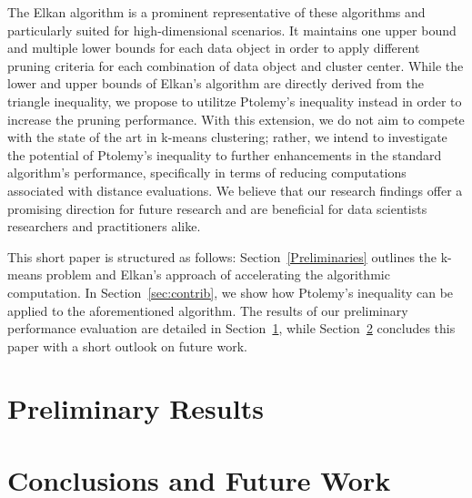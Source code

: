 The Elkan algorithm \cite{DBLP:conf/icml/Elkan03} is a prominent representative of these algorithms and particularly suited for high-dimensional scenarios.
It maintains one upper bound and multiple lower bounds for each data object in order to apply different pruning criteria for each combination of data object and cluster center.
While the lower and upper bounds of Elkan's algorithm are directly derived from the triangle inequality, we propose to utilitze Ptolemy's inequality instead in order to increase the pruning performance.
With this extension, we do not aim to compete with the state of the art in k-means clustering;
rather, we intend to investigate the potential of Ptolemy’s inequality to further enhancements in the standard algorithm’s performance, specifically in terms of reducing computations associated with distance evaluations. We believe that our research findings offer a promising direction for future research and are beneficial for data scientists researchers and practitioners alike.

This short paper is structured as follows:
Section~\ref{Preliminaries} outlines the k-means problem and Elkan's approach of accelerating the algorithmic computation.
In Section~\ref{sec:contrib}, we show how Ptolemy's inequality can be applied to the aforementioned algorithm. %
The results of our preliminary performance evaluation are detailed in Section~\ref{sec: results}, while Section~\ref{sec: conclusions} concludes this paper with a short outlook on future work.













\section{Preliminary Results}\label{sec: results}




\section{Conclusions and Future Work} \label{sec: conclusions}

